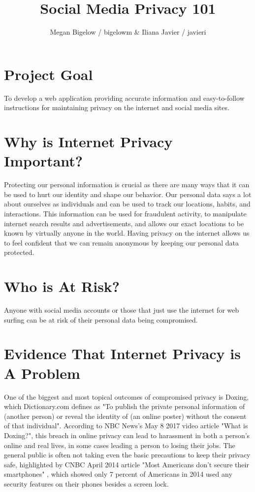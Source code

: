 \documentclass[12pt]{article}
\title{Social Media Privacy 101}
\author{Megan Bigelow / bigelowm & Iliana Javier / javieri}
\begin{document}
\maketitle



\section{Project Goal}
To develop a web application providing accurate information and easy-to-follow instructions for maintaining privacy on the internet and social media sites.
\section{Why is Internet Privacy Important?}
Protecting our personal information is crucial as there are many ways that it can be used to hurt our identity and shape our behavior. Our personal data says a lot about ourselves as individuals and can be used to track our locations, habits, and interactions. This information can be used for fraudulent activity, to manipulate internet search results and advertisements, and allows our exact locations to be known by virtually anyone in the world. Having privacy on the internet allows us to feel confident that we can remain anonymous by keeping our personal data protected.
\section{Who is At Risk?}
Anyone with social media accounts or those that just use the internet for web surfing can be at risk of their personal data being compromised.

\section{Evidence That Internet Privacy is A Problem}
One of the biggest and most topical outcomes of compromised privacy is Doxing, which Dictionary.com defines as "To publish the private personal information of (another person) or reveal the identity of (an online poster) without the consent of that individual". According to NBC News's May 8 2017 video article "What is Doxing?", this breach in online privacy can lead to harassment in both a person's online and real lives, in some cases leading a person to losing their jobs. The general public is often not taking even the basic precautions to keep their privacy safe, highlighted by CNBC April 2014 article "Most Americans don't secure their smartphones" \cite{cnbc2014}, which showed only 7 percent of Americans in 2014 used any security features on their phones besides a screen lock. 
\end{document}
